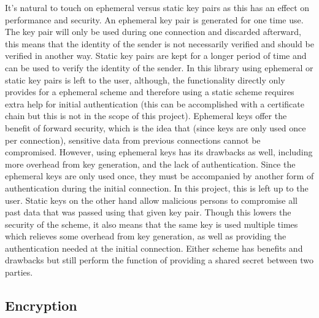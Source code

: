 It's natural to touch on ephemeral versus static key pairs as this has an effect on performance and security. An ephemeral key pair is generated for one time use. The key pair will only be used during one connection and discarded afterward, this means that the identity of the sender is not necessarily verified and should be verified in another way. Static key pairs are kept for a longer period of time and can be used to verify the identity of the sender. In this library using ephemeral or static key pairs is  left to the user, although, the functionality directly only provides for a ephemeral scheme and therefore using a static scheme requires extra help for initial authentication (this can be accomplished with a certificate chain but this is not in the scope of this project). Ephemeral keys offer the benefit of forward security, which is the idea that (since keys are only used once per connection), sensitive data from previous connections cannot be compromised. However, using ephemeral keys has its drawbacks as well, including more overhead from key generation, and the lack of authentication. Since the ephemeral keys are only used once, they must be accompanied by another form of authentication during the initial connection. In this project, this is left up to the user. Static keys on the other hand allow malicious persons to compromise all past data that was passed using that given key pair. Though this lowers the security of the scheme, it also means that the same key is used multiple times which relieves some overhead from key generation, as well as providing the authentication needed at the initial connection. Either scheme has benefits and drawbacks but still perform the function of providing a shared secret between two parties.

\subsection{Encryption}

